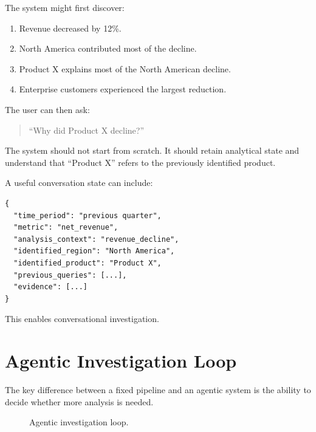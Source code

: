 \documentclass[11pt,a4paper]{article}
\begin{document}
The system might first discover:

\begin{enumerate}
    \item Revenue decreased by 12\%.
    \item North America contributed most of the decline.
    \item Product X explains most of the North American decline.
    \item Enterprise customers experienced the largest reduction.
\end{enumerate}

The user can then ask:

\begin{quote}
``Why did Product X decline?''
\end{quote}

The system should not start from scratch. It should retain analytical state
and understand that ``Product X'' refers to the previously identified product.

A useful conversation state can include:

\begin{lstlisting}
{
  "time_period": "previous quarter",
  "metric": "net_revenue",
  "analysis_context": "revenue_decline",
  "identified_region": "North America",
  "identified_product": "Product X",
  "previous_queries": [...],
  "evidence": [...]
}
\end{lstlisting}

This enables conversational investigation.

\section{Agentic Investigation Loop}

The key difference between a fixed pipeline and an agentic system is the
ability to decide whether more analysis is needed.

\begin{figure}[ht]
\centering
{}
\caption{Agentic investigation loop.}
\end{figure}
\end{document}
